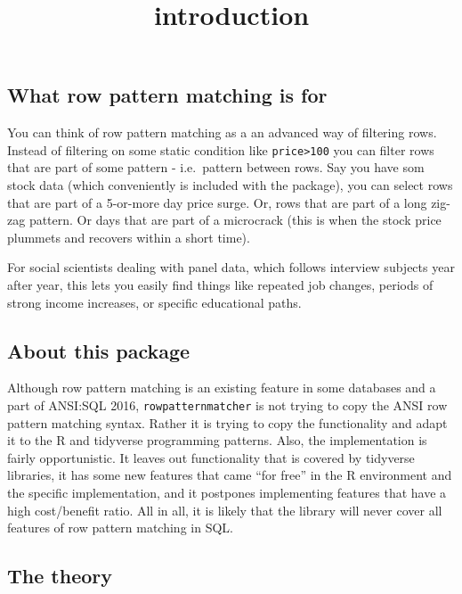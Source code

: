 \documentclass[]{article}
\title{introduction}
\author{}
\date{}
\begin{document}
\maketitle

\hypertarget{what-row-pattern-matching-is-for}{%
\subsection{What row pattern matching is
for}\label{what-row-pattern-matching-is-for}}

You can think of row pattern matching as a an advanced way of filtering
rows. Instead of filtering on some static condition like
\texttt{price\textgreater{}100} you can filter rows that are part of
some pattern - i.e.~pattern between rows. Say you have som stock data
(which conveniently is included with the package), you can select rows
that are part of a 5-or-more day price surge. Or, rows that are part of
a long zig-zag pattern. Or days that are part of a microcrack (this is
when the stock price plummets and recovers within a short time).

For social scientists dealing with panel data, which follows interview
subjects year after year, this lets you easily find things like repeated
job changes, periods of strong income increases, or specific educational
paths.

\hypertarget{about-this-package}{%
\subsection{About this package}\label{about-this-package}}

Although row pattern matching is an existing feature in some databases
and a part of ANSI:SQL 2016, \texttt{rowpatternmatcher} is not trying to
copy the ANSI row pattern matching syntax. Rather it is trying to copy
the functionality and adapt it to the R and tidyverse programming
patterns. Also, the implementation is fairly opportunistic. It leaves
out functionality that is covered by tidyverse libraries, it has some
new features that came ``for free'' in the R environment and the
specific implementation, and it postpones implementing features that
have a high cost/benefit ratio. All in all, it is likely that the
library will never cover all features of row pattern matching in SQL.

\hypertarget{the-theory}{%
\subsection{The theory}\label{the-theory}}
\end{document}
